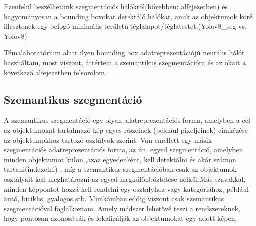 \documentclass[12pt,oneside,a4paper]{article}
\theoremstyle{remark}
\begin{document}
    Ezenfelül beszélhetünk szegmentációs hálókról(bővebben:  alfejezetben) és
    hagyományosan a bounding boxokat detektáló hálókat, amik az objektumok köré illesztenek egy befogó minimális területű téglalapot/téglatestet.(Yolov8\_seg vs. Yolov8)

    Témalaboratórium alatt ilyen bounding box adatreprezentációjú neurális hálót használtam, most viszont, áttértem a szemantikus szegmentációra és az okait a következő alfejezetben felsorolom.
\newpage

\subsection{Szemantikus szegmentáció}\label{subsec:szemantikus-szegmentacio}

A szemantikus szegmentáció egy olyan adatreprezentációs forma, amelyben a cél az objektumokat tartalmazó kép egyes
részeinek (például pixeljeinek) címkézése az objektumokhoz tartozó osztályok szerint.
Van emellett egy másik szegmentációs adatreprezentációs forma, az ún. egyed szegmentáció, amelyben minden objektumot külön ,azaz egyedenként, kell detektálni és akár számon tartani(indexelni) , míg a szemantikus
szegmentációban csak az objektumok osztályait kell meghatározni az egyed megkülönböztetése nélkül.Más szavakkal, minden képpontot
hozzá kell rendelni egy osztályhoz vagy kategóriához, például autó, biciklis, gyalogos stb.
Munkámban eddig viszont csak szemantikus szegmentációval foglalkoztam.
Amely módszer lehetővé teszi a  rendszereknek, hogy pontosan azonosítsák és lokalizálják az
objektumokat egy adott képen.
\end{document}

